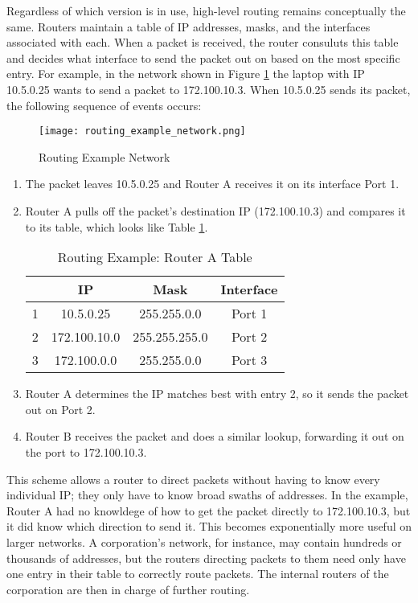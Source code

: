 \par Regardless of which version is in use, high-level routing remains conceptually the same. Routers maintain a table of \ac{IP} addresses, masks, and the interfaces associated with each. When a packet is received, the router consuluts this table and decides what interface to send the packet out on based on the most specific entry. For example, in the network shown in Figure \ref{fig:routing_example_network} the laptop with \ac{IP} 10.5.0.25 wants to send a packet to 172.100.10.3. When 10.5.0.25 sends its packet, the following sequence of events occurs:

\begin{figure}
\caption{Routing Example Network}
\label{fig:routing_example_network}
\centering
\texttt{[image: routing\_example\_network.png]}
\end{figure}

\begin{enumerate}[1.]
\item The packet leaves 10.5.0.25 and Router A receives it on its interface Port 1.
\item Router A pulls off the packet's destination \ac{IP} (172.100.10.3) and compares it to its table, which looks like Table \ref{tbl:routing_example_routera_table}.
	\begin{table}[h]
	\caption{Routing Example: Router A Table}
	\label{tbl:routing_example_routera_table}
	\centering
	\begin{tabular}{r|c|c|c}
	 & \ac{IP} & Mask & Interface\\
	\hline
	1 & 10.5.0.25 & 255.255.0.0 & Port 1\\
	2 & 172.100.10.0 & 255.255.255.0 & Port 2\\
	3 & 172.100.0.0 & 255.255.0.0 & Port 3\\
	\end{tabular}
	\end{table}
\item Router A determines the \ac{IP} matches best with entry 2, so it sends the packet out on Port 2.
\item Router B receives the packet and does a similar lookup, forwarding it out on the port to 172.100.10.3.
\end{enumerate}

\par This scheme allows a router to direct packets without having to know every individual IP; they only have to know broad swaths of addresses. In the example, Router A had no knowldege of how to get the packet directly to 172.100.10.3, but it did know which direction to send it. This becomes exponentially more useful on larger networks. A corporation's network, for instance, may contain hundreds or thousands of addresses, but the routers directing packets to them need only have one entry in their table to correctly route packets. The internal routers of the corporation are then in charge of further routing.

